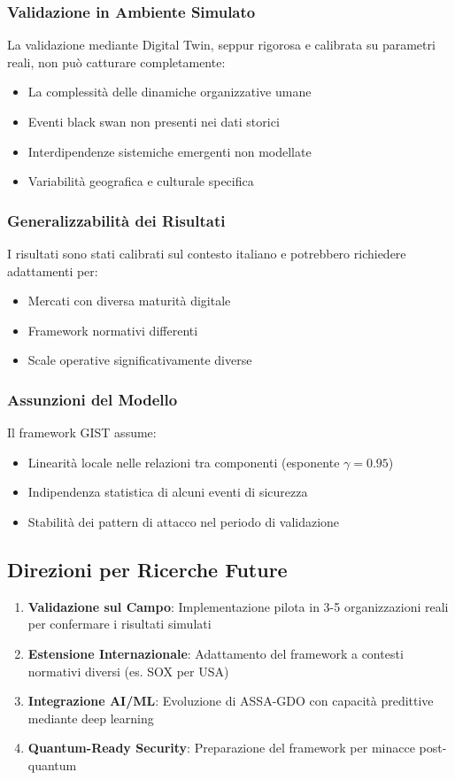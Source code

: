 \subsubsection{Validazione in Ambiente Simulato}
La validazione mediante Digital Twin, seppur rigorosa e calibrata su parametri reali, non può catturare completamente:
\begin{itemize}
\item La complessità delle dinamiche organizzative umane
\item Eventi black swan non presenti nei dati storici
\item Interdipendenze sistemiche emergenti non modellate
\item Variabilità geografica e culturale specifica
\end{itemize}

\subsubsection{Generalizzabilità dei Risultati}
I risultati sono stati calibrati sul contesto italiano e potrebbero richiedere adattamenti per:
\begin{itemize}
\item Mercati con diversa maturità digitale
\item Framework normativi differenti
\item Scale operative significativamente diverse
\end{itemize}

\subsubsection{Assunzioni del Modello}
Il framework GIST assume:
\begin{itemize}
\item Linearità locale nelle relazioni tra componenti (esponente $\gamma = 0.95$)
\item Indipendenza statistica di alcuni eventi di sicurezza
\item Stabilità dei pattern di attacco nel periodo di validazione
\end{itemize}

\subsection{Direzioni per Ricerche Future}

\begin{enumerate}
\item \textbf{Validazione sul Campo}: Implementazione pilota in 3-5 organizzazioni reali per confermare i risultati simulati
\item \textbf{Estensione Internazionale}: Adattamento del framework a contesti normativi diversi (es. SOX per USA)
\item \textbf{Integrazione AI/ML}: Evoluzione di ASSA-GDO con capacità predittive mediante deep learning
\item \textbf{Quantum-Ready Security}: Preparazione del framework per minacce post-quantum
\end{enumerate}



\clearpage
\printbibliography[
    heading=subbibliography,
    title={Riferimenti Bibliografici del Capitolo 5},
]

